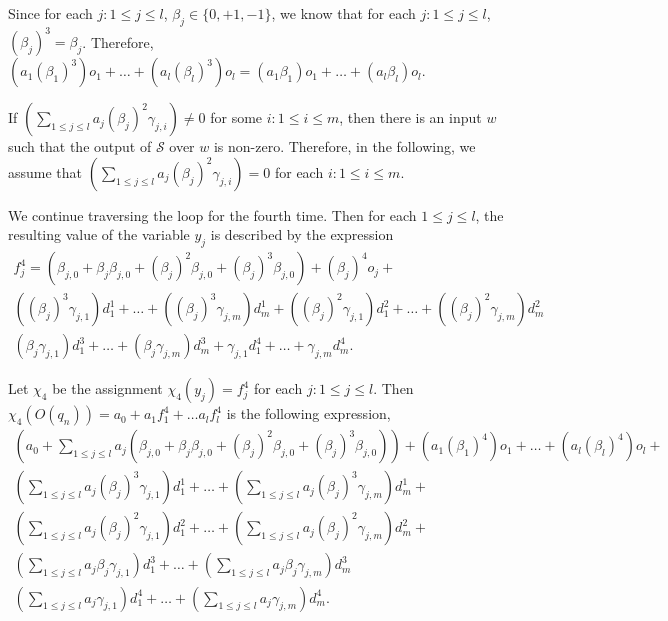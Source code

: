 \documentclass[runningheads,a4paper]{llncs}
\def\Ss{{\mathcal{S} }}
\begin{document}
Since for each $j: 1 \le j \le l$, $\beta_j \in \{0,+1,-1\}$, we know that for each $j: 1 \le j \le l$, $(\beta_j)^3=\beta_j$. Therefore, $(a_1 (\beta_1)^3) o_1 + \dots + (a_l (\beta_l)^3) o_l = (a_1 \beta_1) o_1 + \dots + (a_l \beta_l) o_l$.

If $(\sum \limits_{1 \le j \le l} a_j (\beta_j)^2\gamma_{j,i}) \neq 0$ for some $i: 1 \le i \le m$, then there is an input $w$ such that the output of $\Ss$ over $w$ is non-zero. Therefore, in the following, we assume that $(\sum \limits_{1 \le j \le l} a_j (\beta_j)^2\gamma_{j,i}) = 0$ for each $i: 1 \le i \le m$.


We continue traversing the loop for the fourth time. Then for each $1 \le j \le l$, the resulting value of the variable $y_j$ is described by the expression 
\[
\begin{array}{l}
f^4_{j} = (\beta_{j,0} + \beta_{j} \beta_{j,0} + (\beta_j)^2 \beta_{j,0}+(\beta_j)^3 \beta_{j,0}) + (\beta_{j})^4 o_{j} +
\\
((\beta_{j})^3\gamma_{j,1}) d^1_1 +\dots + ((\beta_{j})^3 \gamma_{j,m}) d^1_m  + 
((\beta_{j})^2\gamma_{j,1}) d^2_1 +\dots + ((\beta_{j})^2 \gamma_{j,m}) d^2_m \\
(\beta_j \gamma_{j,1}) d^3_1 + \dots + (\beta_j \gamma_{j,m}) d^3_m + \gamma_{j,1} d^4_1 + \dots + \gamma_{j,m} d^4_m.
\end{array}
\]

Let $\chi_4$ be the assignment $\chi_4(y_j)=f^4_j$ for each $j: 1\le j \le l$.
Then $\chi_4(O(q_n)) = a_0+ a_1 f^4_1 + \dots a_l f^4_l$ is the following expression,
\[
\begin{array}{l}
(a_0 + \sum \limits_{1 \le j \le l} a_j (\beta_{j,0} + \beta_{j} \beta_{j,0} + (\beta_j)^2 \beta_{j,0} + (\beta_j)^3 \beta_{j,0})) +  (a_1 (\beta_1)^4) o_1 + \dots + (a_l (\beta_l)^4) o_l + \\
 (\sum \limits_{1 \le j \le l} a_j (\beta_{j})^3\gamma_{j,1}) d^1_1 + \dots + (\sum \limits_{1 \le j \le l} a_j (\beta_{j})^3\gamma_{j,m}) d^1_m + \\
 (\sum \limits_{1 \le j \le l} a_j (\beta_{j})^2\gamma_{j,1}) d^2_1 + \dots + (\sum \limits_{1 \le j \le l} a_j (\beta_{j})^2\gamma_{j,m}) d^2_m + \\
(\sum \limits_{1 \le j \le l} a_j \beta_j \gamma_{j,1}) d^3_1 + \dots + (\sum \limits_{1 \le j \le l} a_j \beta_j \gamma_{j,m}) d^3_m \\
(\sum \limits_{1 \le j \le l} a_j \gamma_{j,1}) d^4_1 + \dots + (\sum \limits_{1 \le j \le l} a_j \gamma_{j,m}) d^4_m. 
\end{array}
\]
\end{document}
